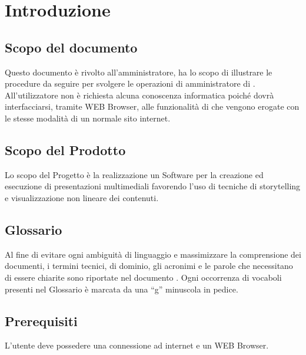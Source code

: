 \section{Introduzione}
\subsection{Scopo del documento}
Questo documento è rivolto all’amministratore, ha lo scopo di illustrare le procedure da seguire per svolgere le operazioni di amministratore di \premi . All’utilizzatore non è richiesta alcuna conoscenza informatica poiché dovrà interfacciarsi, tramite WEB Browser, alle funzionalità di \premi che vengono erogate con le stesse modalità di un normale sito internet.
\subsection{Scopo del Prodotto}
Lo scopo del Progetto è la realizzazione un Software per la creazione ed esecuzione di presentazioni multimediali favorendo l’uso di tecniche di storytelling e visualizzazione non lineare dei contenuti.
\subsection{Glossario}
Al fine di evitare ogni ambiguità di linguaggio e massimizzare la comprensione dei documenti, i termini tecnici, di dominio, gli acronimi e le parole che necessitano di essere chiarite sono riportate nel documento \href{run:../../Esterni/\fGlossario}{\fEscapeGlossario}. Ogni occorrenza di vocaboli presenti nel Glossario è marcata da una “g” minuscola in pedice.
\subsection{Prerequisiti}
L’utente deve possedere una connessione ad internet e un WEB Browser.

